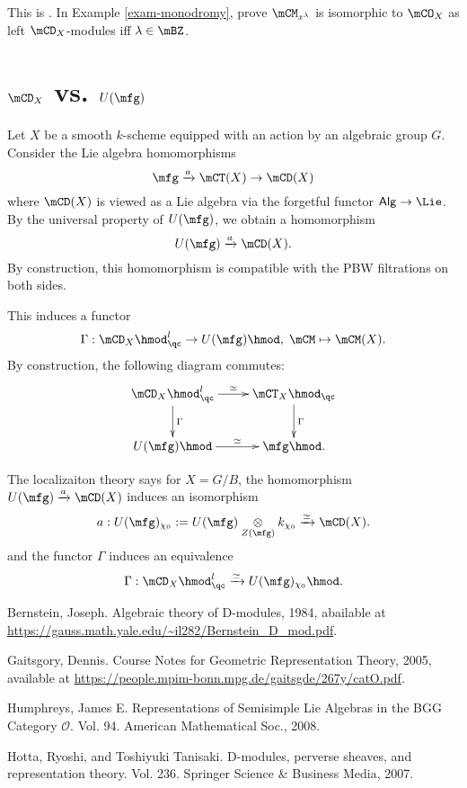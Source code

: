 	\begin{exe}
		This is . In Example \ref{exam-monodromy}, prove $\mCM_{x^\lambda}$ is isomorphic to $\mCO_X$ as left $\mCD_X$-modules iff $\lambda\in \mBZ$.
	\end{exe}
	

\section{\texorpdfstring{$\mCD_X$}{DX} vs. \texorpdfstring{$U(\mfg)$}{U(g)}}
	
	\begin{constr}
		Let $X$ be a smooth $k$-scheme equipped with an action by an algebraic group $G$. Consider the Lie algebra homomorphisms
		\[
			\mfg \xrightarrow{a} \mCT(X) \to \mCD(X)
		\]
		where $\mCD(X)$ is viewed as a Lie algebra via the forgetful functor $\mathsf{Alg} \to \Lie$. By the universal property of $U(\mfg)$, we obtain a homomorphism
		\[
			U(\mfg) \xrightarrow{a}  \mCD(X).
		\]
		By construction, this homomorphism is compatible with the PBW filtrations on both sides.

		This induces a functor
		\[
			\Gamma: \mCD_X\hmod^l_\qc \to U(\mfg)\hmod, \; \mCM \mapsto \mCM(X).
		\]
		By construction, the following diagram commutes:
		\[
			\xymatrix{
				\mCD_X\hmod^l_\qc \ar[r]^-\simeq \ar[d]^-\Gamma&
				\mCT_X\hmod_\qc \ar[d]^-\Gamma \\
				U(\mfg)\hmod \ar[r]^-\simeq & \mfg\hmod.
			}
		\]
	\end{constr}

	\begin{rem}
		The localizaiton theory says for $X=G/B$, the homomorphism $U(\mfg) \xrightarrow{a}  \mCD(X)$ induces an isomorphism
		\[
			a: U(\mfg)_{\chi_0}:= U(\mfg)\ot_{Z(\mfg)} k_{\chi_0} \xrightarrow{\simeq}\mCD(X).
		\]
		and the functor $\Gamma$ induces an equivalence
		\[
			\Gamma: \mCD_X\hmod^l_\qc \xrightarrow{\simeq} U(\mfg)_{\chi_0}\hmod.
		\]
	\end{rem}

	
	




\begin{thebibliography}{Yau}

	 Bernstein, Joseph. Algebraic theory of D-modules, 1984, abailable at \url{https://gauss.math.yale.edu/~il282/Bernstein_D_mod.pdf}.

	 Gaitsgory, Dennis. Course Notes for Geometric Representation Theory, 2005, available at \url{https://people.mpim-bonn.mpg.de/gaitsgde/267y/catO.pdf}.

	 Humphreys, James E. Representations of Semisimple Lie Algebras in the BGG Category $\mathcal{O} $. Vol. 94. American Mathematical Soc., 2008.

	 Hotta, Ryoshi, and Toshiyuki Tanisaki. D-modules, perverse sheaves, and representation theory. Vol. 236. Springer Science \& Business Media, 2007.
\end{thebibliography}


 


